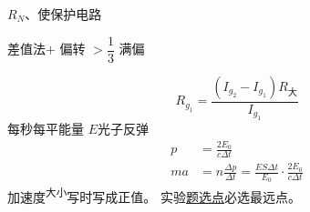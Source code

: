 

$R_N$、使保护电路

差值法\quad $+$ 偏转 $>\dfrac{1}{3}$ 满偏

\[
R_{g_1}=\frac{(I_{g_2}-I_{g_1})R_{\text{大}}}{I_{g_1}}
\]
每秒每平能量 $E$\quad 光子反弹
\begin{align*}
p&=\frac{2E_0}{c\Delta t}\\ %
ma&=n\frac{\Delta p}{\Delta t}=\frac{ES\Delta t}{E_0}\cdot\frac{2E_0}{c\Delta t}
\end{align*}
加速度\textsuperscript{大小}写时写成正值。
实验\underline{题选点}必选最远点。
